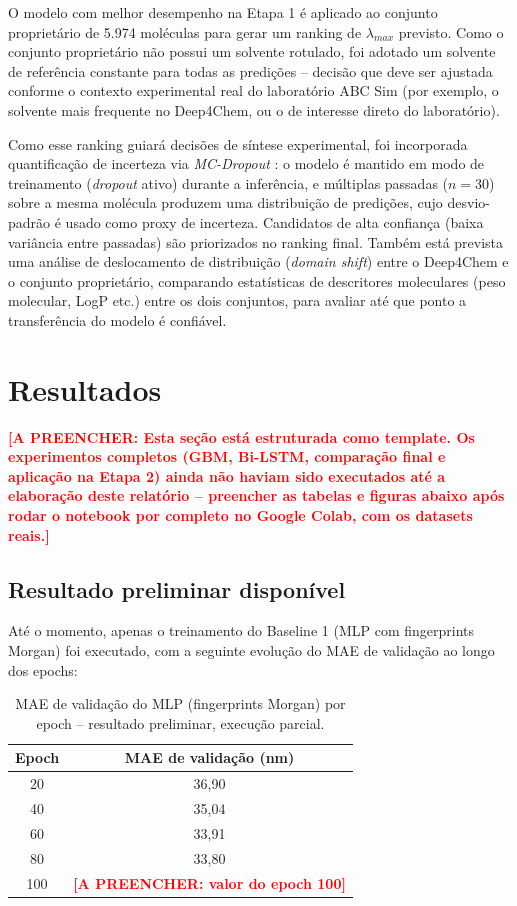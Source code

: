 \documentclass[12pt]{article}
\newcommand{\preencher}[1]{\textcolor{red}{\bfseries [A PREENCHER: #1]}}
\begin{document}
O modelo com melhor desempenho na Etapa 1 é aplicado ao conjunto proprietário de 5.974
moléculas para gerar um ranking de $\lambda_{max}$ previsto. Como o conjunto proprietário
não possui um solvente rotulado, foi adotado um solvente de referência constante para
todas as predições -- decisão que deve ser ajustada conforme o contexto experimental real
do laboratório ABC Sim (por exemplo, o solvente mais frequente no Deep4Chem, ou o de
interesse direto do laboratório).

Como esse ranking guiará decisões de síntese experimental, foi incorporada quantificação
de incerteza via \emph{MC-Dropout} \cite{gal2016}: o modelo é mantido em modo de
treinamento (\emph{dropout} ativo) durante a inferência, e múltiplas passadas
($n=30$) sobre a mesma molécula produzem uma distribuição de predições, cujo desvio-padrão
é usado como proxy de incerteza. Candidatos de alta confiança (baixa variância entre
passadas) são priorizados no ranking final. Também está prevista uma análise de
deslocamento de distribuição (\emph{domain shift}) entre o Deep4Chem e o conjunto
proprietário, comparando estatísticas de descritores moleculares (peso molecular, LogP
etc.) entre os dois conjuntos, para avaliar até que ponto a transferência do modelo é
confiável.


\section{Resultados}
\label{sec:resultados}

\preencher{Esta seção está estruturada como template. Os experimentos completos (GBM,
Bi-LSTM, comparação final e aplicação na Etapa 2) ainda não haviam sido executados até a
elaboração deste relatório -- preencher as tabelas e figuras abaixo após rodar o notebook
por completo no Google Colab, com os datasets reais.}

\subsection{Resultado preliminar disponível}

Até o momento, apenas o treinamento do Baseline 1 (MLP com fingerprints Morgan) foi
executado, com a seguinte evolução do MAE de validação ao longo dos epochs:

\begin{table}[ht]
\centering
\caption{MAE de validação do MLP (fingerprints Morgan) por epoch -- resultado
preliminar, execução parcial.}
\label{tab:mlp-preliminar}
\begin{tabular}{cc}
\toprule
Epoch & MAE de validação (nm) \\
\midrule
20  & 36,90 \\
40  & 35,04 \\
60  & 33,91 \\
80  & 33,80 \\
100 & \preencher{valor do epoch 100} \\
\bottomrule
\end{tabular}
\end{table}
\end{document}
